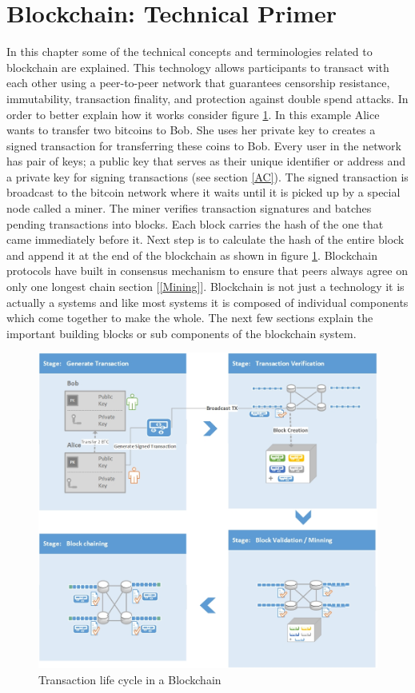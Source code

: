 \section{Blockchain: Technical Primer} \label{Blockchain}
In this chapter some of the technical concepts and terminologies related to blockchain are explained. This technology allows participants to transact with each other using a peer-to-peer network that guarantees censorship resistance, immutability, transaction finality, and protection against double spend attacks. In order to better explain how it works consider figure \ref{fig:bc-workflow}. In this example Alice wants to transfer two bitcoins to Bob. She uses her private key to creates a signed transaction for transferring these coins to Bob. Every user in the network has pair of keys; a public key that serves as their unique identifier or address and a private key for signing transactions (see section \ref{AC}). The signed transaction is broadcast to the bitcoin network where it waits until it is picked up by a special node called a miner. The miner verifies transaction signatures and batches pending transactions into blocks. Each block carries the hash of the one that came immediately before it. Next step is to calculate the hash of the entire block and append it at the end of the blockchain as shown in figure \ref{fig:bc-workflow}. Blockchain protocols have built in consensus mechanism to ensure that peers always agree on only one longest chain section [\ref{Mining}]. Blockchain is not just a technology it is actually a systems and like most systems it is composed of individual components which come together to make the whole. The next few sections explain the important building blocks or sub components of the blockchain system.
\vspace{0.5cm}
\begin{figure}[h]
	\centering
    \includegraphics[width=130mm,scale=1]{figs/bc-workflow}
	\caption{Transaction life cycle in a Blockchain}
	\label{fig:bc-workflow}
\end{figure}
\clearpage


